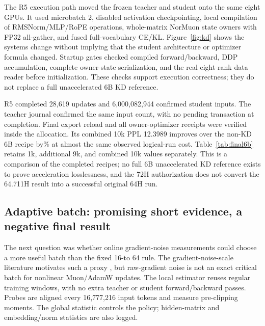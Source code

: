 The R5 execution path moved the frozen teacher and student onto the same eight GPUs. It used microbatch 2, disabled activation checkpointing, local compilation of RMSNorm/MLP/RoPE operations, whole-matrix NorMuon state owners with FP32 all-gather, and fused full-vocabulary CE/KL. Figure~\ref{fig:kd} shows the systems change without implying that the student architecture or optimizer formula changed. Startup gates checked compiled forward/backward, DDP accumulation, complete owner-state serialization, and the real eight-rank data reader before initialization. These checks support execution correctness; they do not replace a full unaccelerated 6B KD reference.

R5 completed 28,619 updates and 6,000,082,944 confirmed student inputs. The teacher journal confirmed the same input count, with no pending transaction at completion. Final export reload and all owner-optimizer receipts were verified inside the allocation. Its combined 10k PPL 12.3989 improves over the non-KD 6B recipe by\KDImprovement\% at almost the same observed logical-run cost. Table~\ref{tab:final6b} retains 1k, additional 9k, and combined 10k values separately. This is a comparison of the completed recipes; no full 6B unaccelerated KD reference exists to prove acceleration losslessness, and the 72H authorization does not convert the 64.711H result into a successful original 64H run.




\subsection{Adaptive batch: promising short evidence, a negative final result}

The next question was whether online gradient-noise measurements could choose a more useful batch than the fixed 16-to 64 rule. The gradient-noise-scale literature motivates such a proxy \citep{gns}, but raw-gradient noise is not an exact critical batch for nonlinear Muon/AdamW updates. The local estimator reuses regular training windows, with no extra teacher or student forward/backward passes. Probes are aligned every 16,777,216 input tokens and measure pre-clipping moments. The global statistic controls the policy; hidden-matrix and embedding/norm statistics are also logged.

